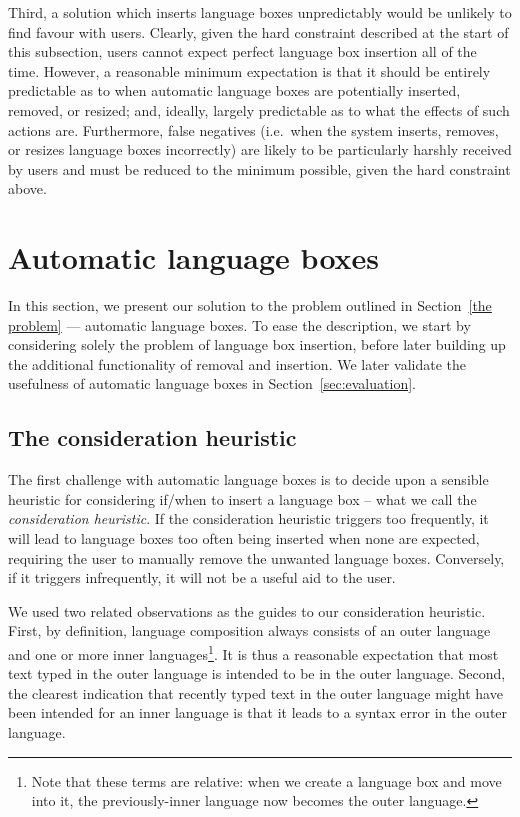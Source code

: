 \documentclass[sigplan,screen]{acmart}\settopmatter{printfolios=true,printccs=false,printacmref=false}
\begin{document}
Third, a solution which inserts language boxes unpredictably would be unlikely
to find favour with users. Clearly, given the hard constraint described at the
start of this subsection, users cannot expect perfect language box insertion
all of the time. However, a reasonable minimum expectation is that it should be
entirely predictable as to when automatic language boxes are potentially
inserted, removed, or
resized; and, ideally, largely predictable as to what the effects of such
actions are. Furthermore, false negatives (i.e.~when the system inserts, removes,
or resizes language boxes incorrectly) are likely to be particularly harshly
received by users and must be reduced to the minimum possible, given the hard
constraint above.


\section{Automatic language boxes}

In this section, we present our solution to the problem outlined in
Section~\ref{the problem} --- automatic language boxes. To ease the
description, we start by considering solely the problem of language box
insertion, before later building up the additional functionality of removal and
insertion. We later validate the usefulness of automatic language boxes in
Section~\ref{sec:evaluation}.


\subsection{The consideration heuristic}

The first challenge with automatic language boxes is to decide upon a sensible
heuristic for considering if/when to insert a language box -- what we call the
\emph{consideration heuristic}. If the consideration heuristic triggers too
frequently, it will lead to language boxes too often being inserted when none
are expected, requiring the user to manually remove the unwanted language
boxes. Conversely, if it triggers infrequently, it will not be a useful aid to the user.

We used two related observations as the guides to our consideration heuristic.
First, by definition, language composition always consists of an outer language
and one or more inner languages\footnote{Note that these terms are relative:
when we create a language box and move into it, the previously-inner language
now becomes the outer language.}. It is thus a reasonable expectation that most
text typed in the outer language is intended to be in the outer language.
Second, the clearest indication that recently typed text in the outer language
might have been intended for an inner language is that it leads to a syntax error
in the outer language.
\end{document}
